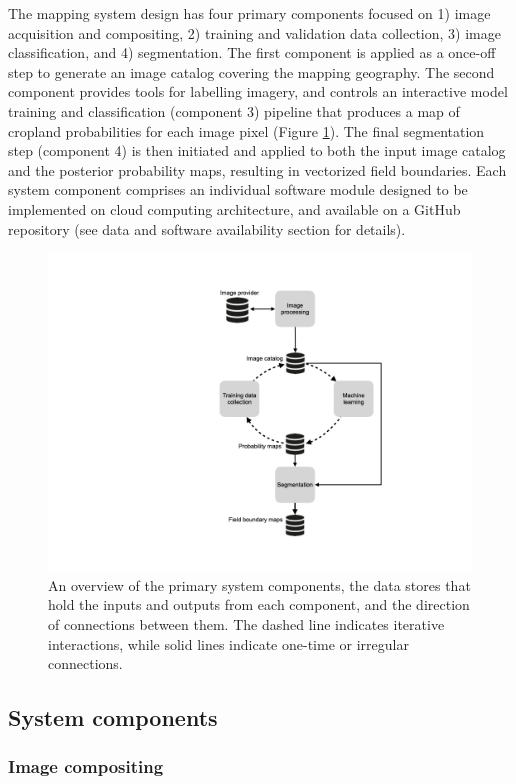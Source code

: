\documentclass[11pt,a4paper]{article}
\begin{document}
The mapping system design has four primary components focused on 1)
image acquisition and compositing, 2) training and validation data
collection, 3) image classification, and 4) segmentation. The first
component is applied as a once-off step to generate an image catalog
covering the mapping geography. The second component provides tools for
labelling imagery, and controls an interactive model training and
classification (component 3) pipeline that produces a map of cropland
probabilities for each image pixel (Figure \ref{fig:systemoverview}).
The final segmentation step (component 4) is then initiated and applied
to both the input image catalog and the posterior probability maps,
resulting in vectorized field boundaries. Each system component
comprises an individual software module designed to be implemented on
cloud computing architecture, and available on a GitHub repository (see
data and software availability section for details).

\begin{figure}

{\centering \includegraphics[width=0.5\linewidth]{figures/figure1} 

}

\caption{An overview of the primary system components, the data stores that hold the inputs and outputs from each component, and the direction of connections between them. The dashed line indicates iterative interactions, while solid lines indicate one-time or irregular connections.}\label{fig:systemoverview}
\end{figure}

\hypertarget{system-components}{%
\subsection{System components}\label{system-components}}

\hypertarget{image-compositing}{%
\subsubsection{Image compositing}\label{image-compositing}}
\end{document}
